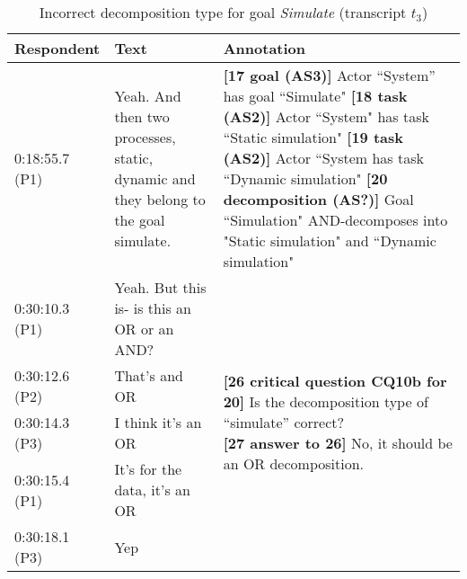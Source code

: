 \begin{table}[!htbp]
\begin{tabular}{|p{20mm}|p{50mm}|p{80mm}|}
\hline
Respondent & Text & Annotation\\
\hline
0:18:55.7 (P1) &Yeah. And then two processes, static, dynamic and they belong to the goal simulate. & \textbf{[17 goal (AS3)]} Actor ``System'' has goal ``Simulate"\newline
\textbf{[18 task (AS2)]} Actor ``System" has task ``Static simulation"\newline
\textbf{[19 task (AS2)]} Actor ``System has task ``Dynamic simulation"\newline
\textbf{[20 decomposition (AS?)]} Goal ``Simulation" AND-decomposes into "Static simulation" and ``Dynamic simulation"\\
\hline
0:30:10.3 (P1) & 	Yeah. But this is- is this an OR or an AND? & \multirow{5}{80mm}{\textbf{[26 critical question CQ10b for 20]} Is the decomposition type of ``simulate'' correct?\newline
\textbf{[27 answer to 26]} No, it should be an OR decomposition.}\\
\cline{1-2}
0:30:12.6 (P2) & That's and OR &\\
\cline{1-2}
0:30:14.3 (P3) & I think it's an OR &\\
\cline{1-2}
0:30:15.4 (P1) & It's for the data, it's an OR &\\
\cline{1-2}
0:30:18.1 (P3) & Yep &\\
\hline	
\end{tabular}
\caption{Incorrect decomposition type for goal \emph{Simulate} (transcript $t_3$)}
\label{table:transcript:decomposition}
\end{table}

